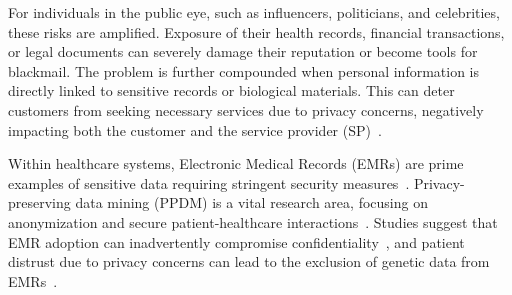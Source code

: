 \documentclass[pdftex,twocolumn,epjc3]{svjour3}
\begin{document}
\begin{sloppypar}
For individuals in the public eye, such as influencers, politicians, and celebrities, these risks are amplified. Exposure of their health records, financial transactions, or legal documents can severely damage their reputation or become tools for blackmail. The problem is further compounded when personal information is directly linked to sensitive records or biological materials.  This can deter customers from seeking necessary services due to privacy concerns, negatively impacting both the customer and the service provider (SP)~\cite{klitzmanExclusionGeneticInformation2010,blackPresymptomaticTestingConfidentiality2021}.
\end{sloppypar}

\begin{sloppypar}
Within healthcare systems, Electronic Medical Records (EMRs) are prime examples of sensitive data requiring stringent security measures~\cite{jinReviewSecurePrivacypreserving2019,keshtaSecurityPrivacyElectronic2021}. Privacy-preserving data mining (PPDM) is a vital research area, focusing on anonymization and secure patient-healthcare interactions~\cite{nareshPrivacyPreservingData2023,linPPSFOpensourcePrivacypreserving2018,hewagePrivacypreservingDataStream2023}. Studies suggest that EMR adoption can inadvertently compromise confidentiality~\cite{blackPresymptomaticTestingConfidentiality2021}, and patient distrust due to privacy concerns can lead to the exclusion of genetic data from EMRs~\cite{klitzmanExclusionGeneticInformation2010}.
\end{sloppypar}
\end{document}
